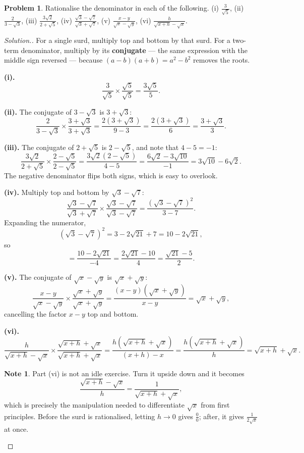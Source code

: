 \documentclass[11pt,a4paper]{article}
\theoremstyle{definition}
\newtheorem{note}[thm]{Note}
\newtheorem{problemx}{Problem}[section]
\newenvironment{problem}{\begin{problemx}}{\end{problemx}}
\newenvironment{solution}
  {\renewcommand{\qedsymbol}{}\begin{proof}[\textit{Solution}.]}
  {\end{proof}}
\begin{document}
\begin{problem}
Rationalise the denominator in each of the following.
\quad (i) $\frac{3}{\sqrt{5}}$, \quad (ii) $\frac{2}{3-\sqrt{3}}$, \quad
(iii) $\frac{3\sqrt{2}}{2+\sqrt{5}}$, \quad
(iv) $\frac{\sqrt{3}-\sqrt{7}}{\sqrt{3}+\sqrt{7}}$, \quad
(v) $\frac{x-y}{\sqrt{x}-\sqrt{y}}$, \quad
(vi) $\frac{h}{\sqrt{x+h}-\sqrt{x}}$.
\end{problem}

\begin{solution}
For a single surd, multiply top and bottom by that surd. For a two-term denominator,
multiply by its \textbf{conjugate} --- the same expression with the middle sign reversed
--- because $(a-b)(a+b)=a^2-b^2$ removes the roots.

\textbf{(i).}
$$\frac{3}{\sqrt{5}}\times\frac{\sqrt{5}}{\sqrt{5}}=\frac{3\sqrt{5}}{5}.$$

\textbf{(ii).} The conjugate of $3-\sqrt{3}$ is $3+\sqrt{3}$:
$$\frac{2}{3-\sqrt{3}}\times\frac{3+\sqrt{3}}{3+\sqrt{3}}
=\frac{2\left(3+\sqrt{3}\right)}{9-3}=\frac{2\left(3+\sqrt{3}\right)}{6}
=\frac{3+\sqrt{3}}{3}.$$

\textbf{(iii).} The conjugate of $2+\sqrt{5}$ is $2-\sqrt{5}$, and note that
$4-5=-1$:
$$\frac{3\sqrt{2}}{2+\sqrt{5}}\times\frac{2-\sqrt{5}}{2-\sqrt{5}}
=\frac{3\sqrt{2}\left(2-\sqrt{5}\right)}{4-5}
=\frac{6\sqrt{2}-3\sqrt{10}}{-1}=3\sqrt{10}-6\sqrt{2}.$$
The negative denominator flips both signs, which is easy to overlook.

\textbf{(iv).} Multiply top and bottom by $\sqrt{3}-\sqrt{7}$:
$$\frac{\sqrt{3}-\sqrt{7}}{\sqrt{3}+\sqrt{7}}\times
\frac{\sqrt{3}-\sqrt{7}}{\sqrt{3}-\sqrt{7}}
=\frac{\left(\sqrt{3}-\sqrt{7}\right)^2}{3-7}.$$
Expanding the numerator,
$$\left(\sqrt{3}-\sqrt{7}\right)^2=3-2\sqrt{21}+7=10-2\sqrt{21},$$
so
$$=\frac{10-2\sqrt{21}}{-4}=\frac{2\sqrt{21}-10}{4}=\frac{\sqrt{21}-5}{2}.$$

\textbf{(v).} The conjugate of $\sqrt{x}-\sqrt{y}$ is $\sqrt{x}+\sqrt{y}$:
$$\frac{x-y}{\sqrt{x}-\sqrt{y}}\times\frac{\sqrt{x}+\sqrt{y}}{\sqrt{x}+\sqrt{y}}
=\frac{(x-y)\left(\sqrt{x}+\sqrt{y}\right)}{x-y}=\sqrt{x}+\sqrt{y},$$
cancelling the factor $x-y$ top and bottom.

\textbf{(vi).}
$$\frac{h}{\sqrt{x+h}-\sqrt{x}}\times\frac{\sqrt{x+h}+\sqrt{x}}{\sqrt{x+h}+\sqrt{x}}
=\frac{h\left(\sqrt{x+h}+\sqrt{x}\right)}{(x+h)-x}
=\frac{h\left(\sqrt{x+h}+\sqrt{x}\right)}{h}=\sqrt{x+h}+\sqrt{x}.$$

\begin{note}
Part (vi) is not an idle exercise. Turn it upside down and it becomes
$$\frac{\sqrt{x+h}-\sqrt{x}}{h}=\frac{1}{\sqrt{x+h}+\sqrt{x}},$$
which is precisely the manipulation needed to differentiate $\sqrt{x}$ from first
principles. Before the surd is rationalised, letting $h\to 0$ gives $\frac{0}{0}$; after,
it gives $\frac{1}{2\sqrt{x}}$ at once.
\end{note}
\end{solution}
\end{document}
